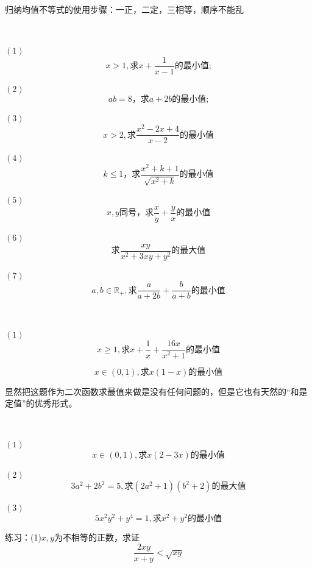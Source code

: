 归纳均值不等式的使用步骤：一正，二定，三相等，顺序不能乱
\begin{example}
    \ 

    $(1)$\[x>1,\text{求}x+\frac{1}{x-1}\text{的最小值;}\]

    $(2)$\[ab=8\text{，求$a+2b$的最小值;}\]

    $(3)$\[x>2,\text{求}\frac{x^2-2x+4}{x-2}\text{的最小值}\]

    $(4)$
    \[k\leq 1\text{，求}\frac{x^2+k+1}{\sqrt{x^2+k}}\text{的最小值}\]

    $(5)$\[x,y\text{同号，求}\frac{x}{y}+\frac{y}{x}\text{的最小值}\]

    $(6)$\[\text{求}\frac{xy}{x^2+3xy+y^2}\text{的最大值}\]

    $(7)$\[a,b\in \mathbb{R}_+,\text{求}\frac{a}{a+2b}+\frac{b}{a+b}\text{的最小值}\]
\end{example}
\begin{exercise}
    \ 

    $(1)$\[x\geq1,\text{求}x+\frac{1}{x}+\frac{16x}{x^2+1}\text{的最小值}\]
\end{exercise}
\begin{example}
    \[x\in(0,1),\text{求}x(1-x)\text{的最小值}\]
\end{example}
\begin{jie}
    显然把这题作为二次函数求最值来做是没有任何问题的，但是它也有天然的“和是定值”的优秀形式。
\end{jie}
\begin{example}
    \ 

    $(1)$\[x\in(0,1),\text{求}x(2-3x)\text{的最小值}\]

    $(2)$\[3a^2+2b^2=5,\text{求}(2a^2+1)(b^2+2)\text{的最大值}\]

    $(3)$\[5x^2y^2+y^4=1,\text{求}x^2+y^2\text{的最小值}\]
\end{example}

练习：(1)$x,y$为不相等的正数，求证
\[\frac{2xy}{x+y}<\sqrt{xy}\]


